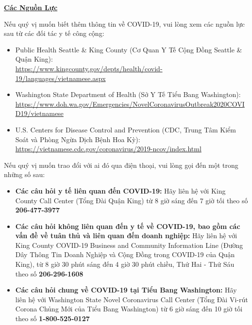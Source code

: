 \documentclass[10pt]{article}
\begin{document}
\bigskip

\large \underline{\textbf{Các Nguồn Lực}}

Nếu quý vị muốn biết thêm thông tin về COVID-19, vui lòng xem các nguồn lực sau
từ các đối tác y tế công cộng:

\begin{itemize}
\item
  Public Health \textemdash Seattle \& King County (Cơ Quan Y Tế Cộng Đồng \textemdash Seattle \& Quận King): \\
  \url{https://www.kingcounty.gov/depts/health/covid-19/languages/vietnamese.aspx}

\item

  Washington State Department of Health (Sở Y Tế Tiểu Bang Washington):\\
  \url{https://www.doh.wa.gov/Emergencies/NovelCoronavirusOutbreak2020COVID19/vietnamese}

\item
  U.S. Centers for Disease Control and Prevention (CDC, Trung Tâm Kiểm Soát và
  Phòng Ngừa Dịch Bệnh Hoa Kỳ):\\
  \url{https://vietnamese.cdc.gov/coronavirus/2019-ncov/index.html}

\end{itemize}

Nếu quý vị muốn trao đổi với ai đó qua điện thoại, vui lòng gọi đến một trong
những số sau:

\begin{itemize}

\item

  \textbf{Các câu hỏi y tế liên quan đến COVID-19:} Hãy liên hệ với King County
  Call Center (Tổng Đài Quận King) từ 8 giờ sáng đến 7 giờ tối theo số
  \textbf{206-477-3977}

\item

  \textbf{Các câu hỏi không liên quan đến y tế về COVID-19, bao gồm các vấn đề
  về tuân thủ và liên quan đến doanh nghiệp:} Hãy liên hệ với King County
  COVID-19 Business and Community Information Line (Đường Dây Thông Tin Doanh
  Nghiệp và Cộng Đồng trong COVID-19 của Quận King), từ 8 giờ 30 phút sáng đến 4
  giờ 30 phút chiều, Thứ Hai - Thứ Sáu theo số \textbf{206-296-1608}

\item

  \textbf{Các câu hỏi chung về COVID-19 tại Tiểu Bang Washington:} Hãy liên hệ
  với Washington State Novel Coronavirus Call Center (Tổng Đài Vi-rút Corona
  Chủng Mới của Tiểu Bang Washington) từ 6 giờ sáng đến 10 giờ tối theo số
  \textbf{1-800-525-0127}

\end{itemize}
\end{document}

